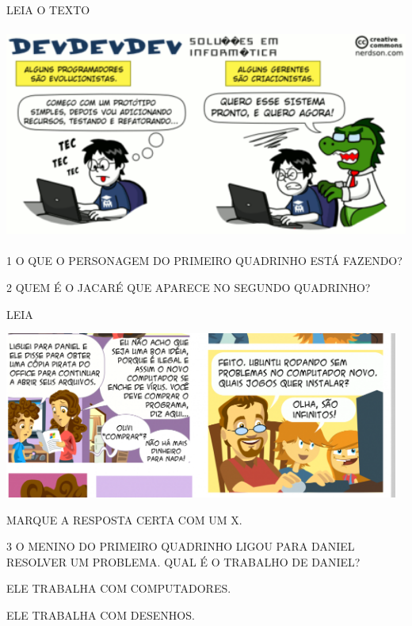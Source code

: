 
LEIA O TEXTO

\includegraphics[width=5.50365in,height=2.75183in]{media/image171.png}


\num{1} O QUE O PERSONAGEM DO PRIMEIRO QUADRINHO ESTÁ FAZENDO?


\num{2} QUEM É O JACARÉ QUE APARECE NO SEGUNDO QUADRINHO?


LEIA

\includegraphics[width=5.11873in,height=2.15447in]{media/image172.png}


MARQUE A RESPOSTA CERTA COM UM X.

\num{3} O MENINO DO PRIMEIRO QUADRINHO LIGOU PARA DANIEL RESOLVER UM PROBLEMA. QUAL É O TRABALHO DE DANIEL?

\begin{boxlist}
\boxitem[{\rosa{X}}] ELE TRABALHA COM COMPUTADORES.

\boxitem[] ELE TRABALHA COM DESENHOS.
\end{boxlist}

